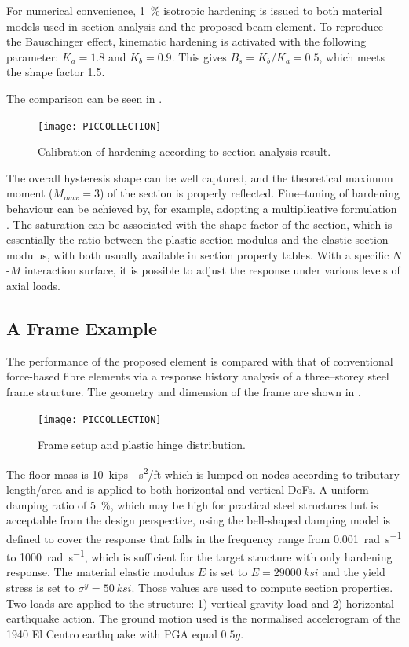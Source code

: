 For numerical convenience, \SI{1}{\percent} isotropic hardening is issued to both material models used in section analysis and the proposed beam element.
To reproduce the Bauschinger effect, kinematic hardening is activated with the following parameter: $K_a=1.8$ and $K_b=0.9$.
This gives $B_s=K_b/K_a=0.5$, which meets the shape factor \num{1.5}.

The comparison can be seen in .
\begin{figure}[htb]
\centering\footnotesize
\texttt{[image: PICCOLLECTION]}
\caption{Calibration of hardening according to section analysis result.}\label{fig:nm_calibration}
\end{figure}
The overall hysteresis shape can be well captured, and the theoretical maximum moment ($M_{max}=3$) of the section is properly reflected.
Fine--tuning of hardening behaviour can be achieved by, for example, adopting a multiplicative formulation \citep{Chaboche1989}.
The saturation can be associated with the shape factor of the section, which is essentially the ratio between the plastic section modulus and the elastic section modulus, with both usually available in section property tables.
With a specific $N$-$M$ interaction surface, it is possible to adjust the response under various levels of axial loads.
\subsection{A Frame Example}
The performance of the proposed element is compared with that of conventional force-based fibre elements via a response history analysis of a three--storey steel frame structure.
The geometry and dimension of the frame are shown in .
\begin{figure}[htb]
\centering\footnotesize
\texttt{[image: PICCOLLECTION]}
\caption{Frame setup and plastic hinge distribution.}\label{fig:nm_frame_hinge}
\end{figure}
The floor mass is \SI{10}{kips\cdot{}s^2/ft} which is lumped on nodes according to tributary length/area and is applied to both horizontal and vertical DoFs.
A uniform damping ratio of \SI{5}{\percent}, which may be high for practical steel structures but is acceptable from the design perspective, using the bell-shaped damping model \citep{Lee2020a,Lee2020b,Lee2021,Lee2022} is defined to cover the response that falls in the frequency range from \SI{0.001}{\radian\per\second} to \SI{1000}{\radian\per\second}, which is sufficient for the target structure with only hardening response.
The material elastic modulus $E$ is set to $E=\SI{29000}{ksi}$ and the yield stress is set to $\sigma^y=\SI{50}{ksi}$.
Those values are used to compute section properties.
Two loads are applied to the structure: 1) vertical gravity load and 2) horizontal earthquake action.
The ground motion used is the normalised accelerogram of the 1940 El Centro earthquake with PGA equal $0.5g$.

